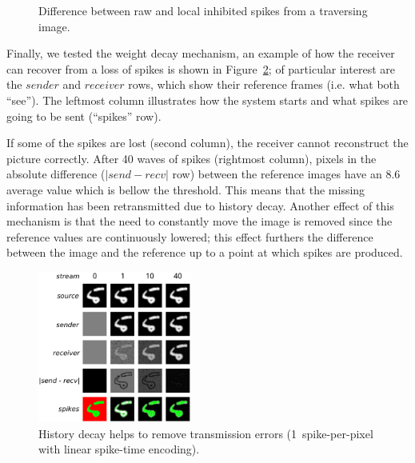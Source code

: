 \documentclass[conference]{IEEEtran}
\begin{document}
\begin{figure}[htb]
  \caption[Difference between raw and local inhibited spikes from a traversing image.]{Difference between raw and local inhibited spikes from a traversing image.}
  \label{fig:inh_diff}
\end{figure}

Finally, we tested the weight decay mechanism, an example of how the receiver can recover from a loss of spikes is shown in Figure~\ref{fig:history_decay}; of particular interest are the $sender$ and $receiver$ rows, which show their reference frames (i.e. what both ``see''). The leftmost column illustrates how the system starts and what spikes are going to be sent (``spikes'' row).

If some of the spikes are lost (second column), the receiver cannot reconstruct the picture correctly. After 40 waves of spikes (rightmost column),  pixels in the absolute difference ($|send-recv|$ row) between the reference images have an 8.6 average value which is bellow the threshold. This means that the missing information has been retransmitted due to history decay. Another effect of this mechanism is that the need to constantly move the image is removed since the reference values are continuously lowered; this effect furthers the difference between the image and the reference up to a point at which spikes are produced.

\setcounter{figure}{13} %
\begin{figure}[htb]
  \centering
  
  \includegraphics[width=0.45\textwidth]{history_decay}
  \caption{History decay helps to remove transmission errors (1~spike-per-pixel with linear spike-time encoding).}
  \label{fig:history_decay}
\end{figure}
\end{document}
